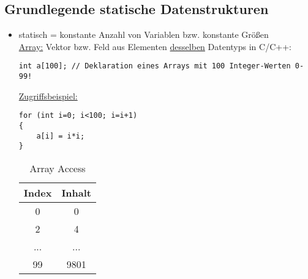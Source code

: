 \subsection{Grundlegende statische Datenstrukturen}
\begin{itemize}
\item statisch = konstante Anzahl von Variablen bzw. konstante Größen \\
\underline{Array:} Vektor bzw. Feld aus Elementen \underline{desselben} Datentyps
in C/C++:
\begin{lstlisting}
int a[100]; // Deklaration eines Arrays mit 100 Integer-Werten 0-99!
\end{lstlisting}
\underline{Zugriffsbeispiel:}
\begin{lstlisting}
for (int i=0; i<100; i=i+1)
{
	a[i] = i*i;
}
\end{lstlisting}
\begin{table}[h]
	\caption[Array Access Beispiel]{Array Access}
	\begin{center}
	\begin{tabular}{c|c}
		Index & Inhalt\\
		\hline
		0 & 0\\
		2 & 4\\
		... & ...\\
		99 & 9801\\
	\end{tabular}
	\end{center}
\end{table}

\end{itemize}


